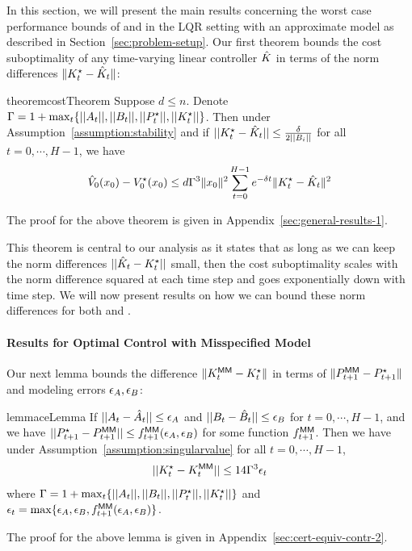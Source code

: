 In this section, we will present the main results concerning the worst
case performance bounds of \MM{} and \ILC{} in the LQR setting with an
approximate model as described in Section~\ref{sec:problem-setup}. Our
first theorem
bounds the cost suboptimality of any time-varying linear 
controller $\hat{K}$ in terms of the norm differences $\|K^\star_t -
\hat{K}_t\|$:
\begin{restatable}{theorem}{costTheorem}
  \label{theorem:cost}
  Suppose $d \leq n$. Denote
  $\Gamma = 1 + \max_t\{||A_t||, ||B_t||, ||P^\star_t||, ||K^\star_t||\}$. Then under
  Assumption~\ref{assumption:stability} and if $||K^\star_{t} -
  \hat{K}_{t}|| \le \frac{\delta}{2||B_{i}||}$ for all $t=0, \cdots, H-1$, we have
  \begin{equation}
    \label{eq:cost}
    \hat{V}_0(x_0) - V^\star_0(x_0) \leq d\Gamma^{3}\|x_{0}\|^{2} \sum_{t=0}^{H-1} e^{-\delta t}\|K^\star_{t} - \hat{K}_{t}\|^{2}
  \end{equation}
\end{restatable}
The proof for the above theorem is given in
Appendix~\ref{sec:general-results-1}.

This theorem is central to our analysis as it states that as long as we can keep
the norm differences $||\hat{K}_{t} - K^\star_{t}||$ small, then the cost
suboptimality scales 
with the norm difference squared at each time step and goes exponentially down
with time step. %
We will now present results on how we can
bound these norm differences for both \MM{} and \ILC{}.

\paragraph{Results for Optimal Control with Misspecified Model}
\label{sec:optimal-control-with}

Our next
lemma bounds the difference $\|K^\mathsf{MM}_t - K^\star_t\|$ in terms of
$\|P^\mathsf{MM}_{t+1} - P^\star_{t+1}\|$ and modeling errors $\epsilon_A, \epsilon_B$:
\begin{restatable}{lemma}{ceLemma}
  \label{lemma:ce}
  If $||A_{t} - \hat{A}_{t}|| \leq \epsilon_A$ and
  $||B_{t} - \hat{B}_{t}|| \leq \epsilon_B$ for $t=0, \cdots, H-1$, and we have
  $||P^\star_{t+1} - P^\mathsf{MM}_{t+1}|| \leq f^\mathsf{MM}_{t+1}(\epsilon_A, \epsilon_B)$ for some function
  $f^\mathsf{MM}_{t+1}$. Then we have under
  Assumption~\ref{assumption:singularvalue} for all $t=0, \cdots, H-1$,
  \begin{align}
    ||K^\star_{t} - K^\mathsf{MM}_{t}|| \leq 14\Gamma^3\epsilon_t
    \label{eq:ce-k-diff}
  \end{align}
  where
  $\Gamma = 1 + \max_{t}\{||A_{t}||, ||B_{t}||, ||P^\star_{t}||, ||K^\star_{t}||\}$
  and $\epsilon_{t} = \max\{\epsilon_A, \epsilon_B, f^\mathsf{MM}_{t+1}(\epsilon_A, \epsilon_B)\}$.
\end{restatable}
The proof for the above lemma is given in Appendix~\ref{sec:cert-equiv-contr-2}.

